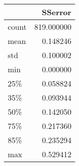 \begin{tabular}{lr}
\toprule
{} &     SSerror \\
\midrule
count &  819.000000 \\
mean  &    0.148246 \\
std   &    0.100002 \\
min   &    0.000000 \\
25\%   &    0.058824 \\
35\%   &    0.093944 \\
50\%   &    0.142050 \\
75\%   &    0.217360 \\
85\%   &    0.235294 \\
max   &    0.529412 \\
\bottomrule
\end{tabular}
